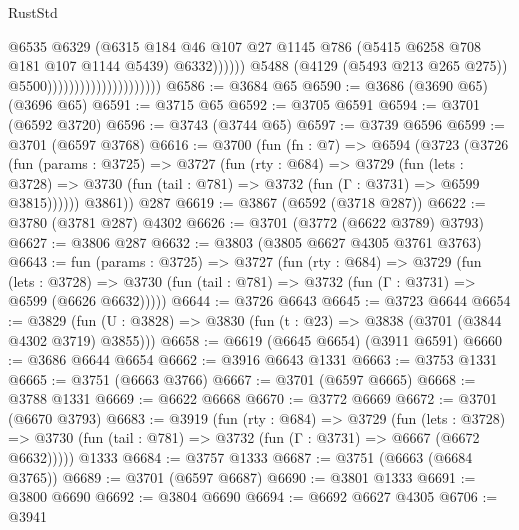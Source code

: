 \begin{lexlean}{RustStd}
\begin{coremodule}
{\begin{coremodule}
{{{{{{{{{{{{{{                                                        @6535
                                                        @6329
                                                        (@6315
                                                          @184
                                                          @46
                                                          @107
                                                          @27
                                                          @1145
                                                          @786
                                                          (@5415 @6258 @708 @181 @107 @1144 @5439)
                                                          @6332))))))
                                              @5488
                                              (@4129 (@5493 @213 @265 @275))
                                              @5500)))))))))))))))))))))
@6586 := @3684 @65
@6590 := @3686 (@3690 @65) (@3696 @65)
@6591 := @3715 @65
@6592 := @3705 @6591
@6594 := @3701 (@6592 @3720)
@6596 := @3743 (@3744 @65)
@6597 := @3739 @6596
@6599 := @3701 (@6597 @3768)
@6616 := @3700
    (fun (fn : @7) =>
    @6594
      (@3723
        (@3726
          (fun (params : @3725) =>
          @3727
            (fun (rty : @684) =>
            @3729
              (fun (lets : @3728) =>
              @3730 (fun (tail : @781) => @3732 (fun (Γ : @3731) => @6599 @3815))))))
        @3861))
    @287
@6619 := @3867 (@6592 (@3718 @287))
@6622 := @3780 (@3781 @287) @4302
@6626 := @3701 (@3772 (@6622 @3789) @3793)
@6627 := @3806 @287
@6632 := @3803 (@3805 @6627 @4305 @3761 @3763)
@6643 := fun (params : @3725) =>
  @3727
    (fun (rty : @684) =>
    @3729
      (fun (lets : @3728) =>
      @3730 (fun (tail : @781) => @3732 (fun (Γ : @3731) => @6599 (@6626 @6632)))))
@6644 := @3726 @6643
@6645 := @3723 @6644
@6654 := @3829 (fun (U : @3828) => @3830 (fun (t : @23) => @3838 (@3701 (@3844 @4302 @3719) @3855)))
@6658 := @6619 (@6645 @6654) (@3911 @6591)
@6660 := @3686 @6644 @6654
@6662 := @3916 @6643 @1331
@6663 := @3753 @1331
@6665 := @3751 (@6663 @3766)
@6667 := @3701 (@6597 @6665)
@6668 := @3788 @1331
@6669 := @6622 @6668
@6670 := @3772 @6669
@6672 := @3701 (@6670 @3793)
@6683 := @3919
    (fun (rty : @684) =>
    @3729
      (fun (lets : @3728) =>
      @3730 (fun (tail : @781) => @3732 (fun (Γ : @3731) => @6667 (@6672 @6632)))))
    @1333
@6684 := @3757 @1333
@6687 := @3751 (@6663 (@6684 @3765))
@6689 := @3701 (@6597 @6687)
@6690 := @3801 @1333
@6691 := @3800 @6690
@6692 := @3804 @6690
@6694 := @6692 @6627 @4305
@6706 := @3941
}}}}}}}}}}}}}}
\end{coremodule}}
\end{coremodule}
\end{lexlean}
